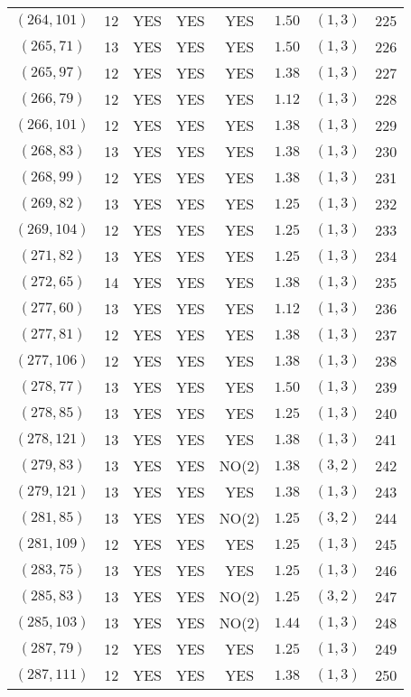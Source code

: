 \begin{longtable}{|c|c|c|c|c|c|c|c|}
$(264,101)$ & 12 & YES & YES & YES & $1.50$ & $(1,3)$ & 225\\
$(265,71)$ & 13 & YES & YES & YES & $1.50$ & $(1,3)$ & 226\\
$(265,97)$ & 12 & YES & YES & YES & $1.38$ & $(1,3)$ & 227\\
$(266,79)$ & 12 & YES & YES & YES & $1.12$ & $(1,3)$ & 228\\
$(266,101)$ & 12 & YES & YES & YES & $1.38$ & $(1,3)$ & 229\\
$(268,83)$ & 13 & YES & YES & YES & $1.38$ & $(1,3)$ & 230\\
$(268,99)$ & 12 & YES & YES & YES & $1.38$ & $(1,3)$ & 231\\
$(269,82)$ & 13 & YES & YES & YES & $1.25$ & $(1,3)$ & 232\\
$(269,104)$ & 12 & YES & YES & YES & $1.25$ & $(1,3)$ & 233\\
$(271,82)$ & 13 & YES & YES & YES & $1.25$ & $(1,3)$ & 234\\
$(272,65)$ & 14 & YES & YES & YES & $1.38$ & $(1,3)$ & 235\\
$(277,60)$ & 13 & YES & YES & YES & $1.12$ & $(1,3)$ & 236\\
$(277,81)$ & 12 & YES & YES & YES & $1.38$ & $(1,3)$ & 237\\
$(277,106)$ & 12 & YES & YES & YES & $1.38$ & $(1,3)$ & 238\\
$(278,77)$ & 13 & YES & YES & YES & $1.50$ & $(1,3)$ & 239\\
$(278,85)$ & 13 & YES & YES & YES & $1.25$ & $(1,3)$ & 240\\
$(278,121)$ & 13 & YES & YES & YES & $1.38$ & $(1,3)$ & 241\\
$(279,83)$ & 13 & YES & YES & NO(2) & $1.38$ & $(3,2)$ & 242\\
$(279,121)$ & 13 & YES & YES & YES & $1.38$ & $(1,3)$ & 243\\
$(281,85)$ & 13 & YES & YES & NO(2) & $1.25$ & $(3,2)$ & 244\\
$(281,109)$ & 12 & YES & YES & YES & $1.25$ & $(1,3)$ & 245\\
$(283,75)$ & 13 & YES & YES & YES & $1.25$ & $(1,3)$ & 246\\
$(285,83)$ & 13 & YES & YES & NO(2) & $1.25$ & $(3,2)$ & 247\\
$(285,103)$ & 13 & YES & YES & NO(2) & $1.44$ & $(1,3)$ & 248\\
$(287,79)$ & 12 & YES & YES & YES & $1.25$ & $(1,3)$ & 249\\
$(287,111)$ & 12 & YES & YES & YES & $1.38$ & $(1,3)$ & 250\\

\end{longtable}
